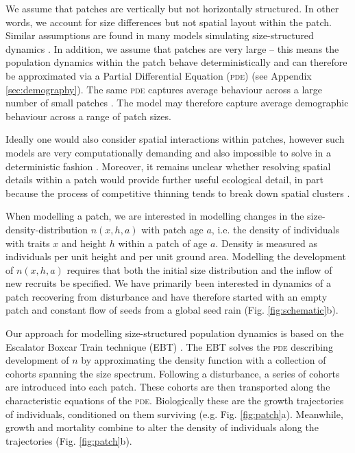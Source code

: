 \documentclass[a4paper,11pt]{article}
\begin{document}
We assume that patches are vertically but not horizontally
structured. In other words, we account for size differences but not spatial 
layout within the patch. Similar assumptions are found in many models
simulating size-structured dynamics
\citep{Shugart-1980,Kohyama-1993, Huston-1987, Moorcroft-2001, Smith-2014}. In addition, 
we assume that patches are very large -- this means the population dynamics 
within the patch behave deterministically \citep{Deroos-1997} and can therefore 
be approximated via a Partial Differential Equation (\textsc{pde}) (see Appendix
\ref{sec:demography}). The same \textsc{pde} captures average behaviour
across a large number of small patches \citep{Moorcroft-2001}. The model may 
therefore capture average demographic behaviour across a range of patch sizes.

Ideally one would also consider spatial interactions within patches,
however such models are very computationally demanding and also
impossible to solve in a deterministic fashion \citep{Huston-1987, 
Pacala-1996}. Moreover, it remains unclear whether resolving spatial details within a
patch would provide further useful ecological detail, in part because the
process of competitive thinning tends to break down spatial clusters
\citep{Strigul-2008}.

When modelling a patch, we are interested in modelling changes in the size-
density-distribution \(n(x,h,a)\) with patch age \(a\), i.e. the density of
individuals with traits \(x\) and height \(h\) within a patch of age \(a\).
Density is measured as individuals per unit height and per unit ground area.
Modelling the development of  \(n(x,h,a)\) requires that both the initial size
distribution and the inflow of new recruits be specified. We have primarily
been interested in dynamics of a patch recovering from disturbance and have
therefore started with an empty patch and constant flow of seeds from a global
seed rain (Fig. \ref{fig:schematic}b).

Our approach for modelling size-structured population dynamics
is based on the Escalator Boxcar Train technique (\textsc{EBT})
\citep{Deroos-1988, Deroos-1992, Deroos-1997}. The \textsc{EBT} solves the \textsc{pde}
describing development of \(n\) by approximating the density function
with a collection of cohorts spanning the size spectrum. Following a
disturbance, a series of cohorts are introduced into each patch. These
cohorts are then transported along the characteristic equations of the
\textsc{pde}. Biologically these are the growth trajectories of individuals,
conditioned on them surviving (e.g. Fig. \ref{fig:patch}a). Meanwhile,
growth and mortality combine to alter the density of individuals along
the trajectories (Fig. \ref{fig:patch}b).
\end{document}

